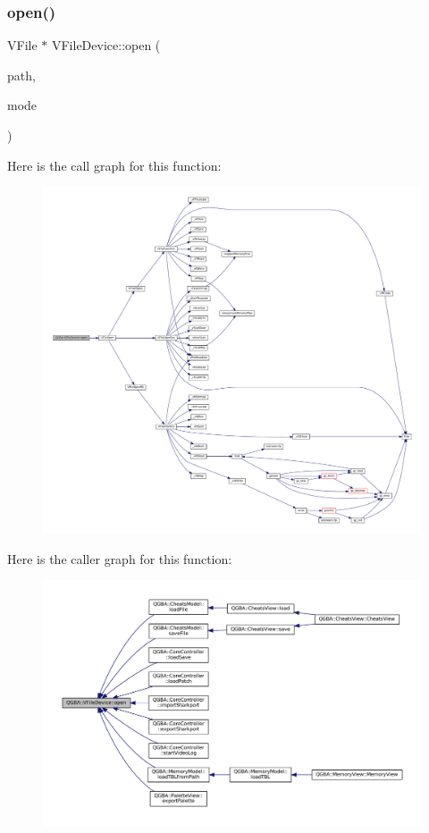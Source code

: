 \subsubsection{\texorpdfstring{open()}{open()}}
{\footnotesize\ttfamily V\+File $\ast$ V\+File\+Device\+::open (\begin{DoxyParamCaption}\item[{const Q\+String \&}]{path,  }\item[{\mbox{\hyperlink{ioapi_8h_a787fa3cf048117ba7123753c1e74fcd6}{int}}}]{mode }\end{DoxyParamCaption})\hspace{0.3cm}{\ttfamily [static]}}

Here is the call graph for this function\+:
\nopagebreak
\begin{figure}[H]
\begin{center}
\leavevmode
\includegraphics[width=350pt]{class_q_g_b_a_1_1_v_file_device_adec7773d5ea263d2f4f6b0e46fcfd318_cgraph}
\end{center}
\end{figure}
Here is the caller graph for this function\+:
\nopagebreak
\begin{figure}[H]
\begin{center}
\leavevmode
\includegraphics[width=350pt]{class_q_g_b_a_1_1_v_file_device_adec7773d5ea263d2f4f6b0e46fcfd318_icgraph}
\end{center}
\end{figure}
